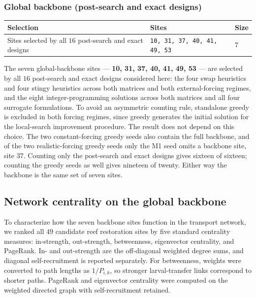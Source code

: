 \documentclass[11pt]{article}
\begin{document}
\subsubsection*{Global backbone (post-search and exact designs)}

\begin{table}[H]
\centering
\small
\begin{tabular}{@{}lll@{}}
\toprule
\textbf{Selection} & \textbf{Sites} & \textbf{Size} \\
\midrule
Sites selected by all $16$ post-search and exact designs & \texttt{10, 31, 37, 40, 41, 49, 53} & 7 \\
\bottomrule
\end{tabular}
\end{table}

The seven global-backbone sites --- \textbf{10, 31, 37, 40, 41, 49, 53} --- are selected by all $16$ post-search and exact designs considered here: the four swap heuristics and four stingy heuristics across both matrices and both external-forcing regimes, and the eight integer-programming solutions across both matrices and all four surrogate formulations. To avoid an asymmetric counting rule, standalone greedy is excluded in both forcing regimes, since greedy generates the initial solution for the local-search improvement procedure. The result does not depend on this choice. The two constant-forcing greedy seeds also contain the full backbone, and of the two realistic-forcing greedy seeds only the M1 seed omits a backbone site, site $37$. Counting only the post-search and exact designs gives sixteen of sixteen; counting the greedy seeds as well gives nineteen of twenty. Either way the backbone is the same set of seven sites.

\subsection{Network centrality on the global backbone}

To characterize how the seven backbone sites function in the transport network, we ranked all $49$ candidate reef restoration sites by five standard centrality measures: in-strength, out-strength, betweenness, eigenvector centrality, and PageRank. In- and out-strength are the off-diagonal weighted degree sums, and diagonal self-recruitment is reported separately. For betweenness, weights were converted to path lengths as $1/P_{i,k}$, so stronger larval-transfer links correspond to shorter paths. PageRank and eigenvector centrality were computed on the weighted directed graph with self-recruitment retained.
\end{document}
